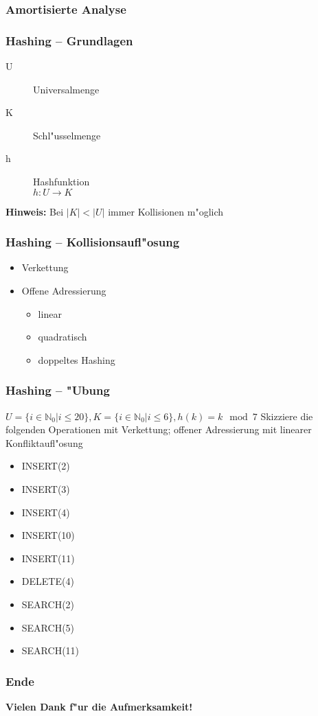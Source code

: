 \documentclass{beamer}
\begin{document}
\begin{frame}
\frametitle{Amortisierte Analyse}
\end{frame}


\begin{frame}
\frametitle{Hashing -- Grundlagen}
\begin{block}{}
\begin{description}
\item[U] Universalmenge
\item[K] Schl"usselmenge
\item[h] Hashfunktion\\$h : U \rightarrow K$
\end{description}
\pause
\textbf{Hinweis:} Bei $\left|K\right| < \left|U\right|$ \alert{immer} Kollisionen m"oglich 
\end{block}
\end{frame}


\begin{frame}
\frametitle{Hashing -- Kollisionsaufl"osung}
\begin{block}{}
\begin{itemize}
\item Verkettung
\item Offene Adressierung
\begin{itemize}
\item linear
\item quadratisch
\item doppeltes Hashing
\end{itemize}
\end{itemize}
\end{block}
\end{frame}


\begin{frame}
\frametitle{Hashing -- "Ubung}
\begin{exampleblock}{$U = \{ i \in \mathbb{N}_0 | i \leq 20 \}, K = \{ i \in \mathbb{N}_0 | i \leq 6 \}, h(k) = k \mod 7$}
Skizziere die folgenden Operationen mit Verkettung; offener Adressierung mit linearer Konfliktaufl"osung
\begin{itemize}
\item INSERT(2)
\item INSERT(3)
\item INSERT(4)\pause
\item INSERT(10)\pause
\item INSERT(11)\pause
\item DELETE(4)\pause
\item SEARCH(2)\pause
\item SEARCH(5)\pause
\item SEARCH(11)
\end{itemize}
\end{exampleblock}
\end{frame}


\begin{frame}
\frametitle{Ende}
\begin{center}
\textbf{\Huge Vielen Dank f"ur die Aufmerksamkeit!}
\end{center}
\end{frame}
\end{document}
